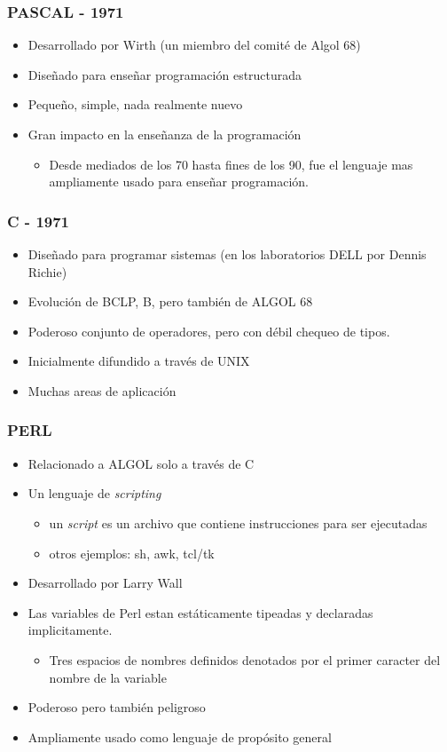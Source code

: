 \documentclass[11pt]{article}
\begin{document}
\subsubsection*{PASCAL - 1971}
\label{sec:orgheadline85}
\begin{itemize}
\item Desarrollado por Wirth (un miembro del comité de Algol 68)
\item Diseñado para enseñar programación estructurada
\item Pequeño, simple, nada realmente nuevo
\item Gran impacto en la enseñanza de la programación
\begin{itemize}
\item Desde mediados de los 70 hasta fines de los 90, fue el lenguaje
mas ampliamente usado para enseñar programación.
\end{itemize}
\end{itemize}

\subsubsection*{C - 1971}
\label{sec:orgheadline86}
\begin{itemize}
\item Diseñado para programar sistemas (en los laboratorios DELL por
Dennis Richie)
\item Evolución de BCLP, B, pero también de ALGOL 68
\item Poderoso conjunto de operadores, pero con débil chequeo de tipos.
\item Inicialmente difundido a través de UNIX
\item Muchas areas de aplicación
\end{itemize}

\subsubsection*{PERL}
\label{sec:orgheadline87}
\begin{itemize}
\item Relacionado a ALGOL solo a través de C
\item Un lenguaje de \emph{scripting}
\begin{itemize}
\item un \emph{script} es un archivo que contiene instrucciones para ser ejecutadas
\item otros ejemplos: sh, awk, tcl/tk
\end{itemize}
\item Desarrollado por Larry Wall
\item Las variables de Perl estan estáticamente tipeadas y declaradas implicitamente.
\begin{itemize}
\item Tres espacios de nombres definidos denotados por el primer
caracter del nombre de la variable
\end{itemize}
\item Poderoso pero también peligroso
\item Ampliamente usado como lenguaje de propósito general
\end{itemize}
\end{document}
